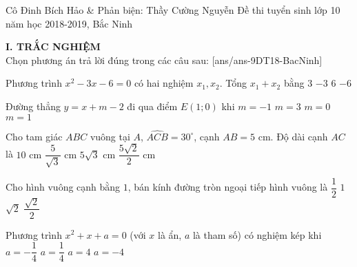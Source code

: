 \begin{name}
{Cô Đinh Bích Hảo \& Phản biện: Thầy Cường Nguyễn}
{Đề thi tuyển sinh lớp 10 năm học 2018-2019, Bắc Ninh}
\end{name}
{\textbf{I. TRẮC NGHIỆM} \\Chọn phương án trả lời đúng trong các câu sau:}
\setcounter{ex}{0}
[ans/ans-9DT18-BacNinh]
\begin{ex}%
Phương trình $x^2-3x-6=0$ có hai nghiệm $x_1,x_2$. Tổng $x_1+x_2$ bằng
\choice
{\True $3$}
{$-3$}
{$6$}
{ $-6$}
\end{ex}

\begin{ex}%
Đường thẳng $y=x+m-2$ đi qua điểm $E(1;0)$ khi
\choice
{ $m=-1$}
{$m=3$}
{$m=0$}
{\True $m=1$}
\end{ex}


\begin{ex}%
Cho tam giác $ABC$ vuông tại $A$, $\widehat{ACB}=30^{\circ}$, cạnh $AB=5$ cm. Độ dài cạnh $AC$ là 
\choice
{$10$ cm}
{$\dfrac{5}{\sqrt{3}}$ cm}
{\True $5\sqrt{3}$ cm}
{$\dfrac{5\sqrt{2}}{2}$ cm}
\end{ex}

\begin{ex}%
Cho hình vuông cạnh bằng $1$, bán kính đường tròn ngoại tiếp hình vuông là
\choice
{$\dfrac{1}{2}$}
{$1$}
{$\sqrt{2}$}
{\True  $\dfrac{\sqrt{2}}{2}$}
\end{ex}

\begin{ex}%
Phương trình $x^2+x+a=0$ (với $x$ là ẩn, $a$ là tham số) có nghiệm kép khi
\choice
{$a=-\dfrac{1}{4}$}
{\True $a=\dfrac{1}{4}$}
{$a=4$}
{ $a=-4$}
\end{ex} 

